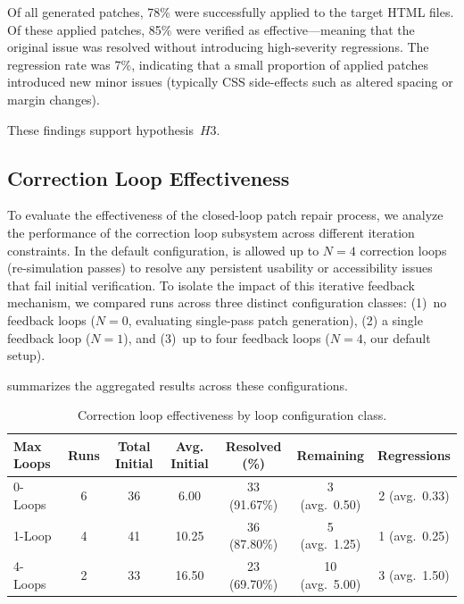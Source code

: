 Of all generated patches, 78\% were successfully applied to the target HTML files. Of these applied patches, 85\% were verified as effective---meaning that the original issue was resolved without introducing high-severity regressions. The regression rate was 7\%, indicating that a small proportion of applied patches introduced new minor issues (typically CSS side-effects such as altered spacing or margin changes).

These findings support hypothesis~$H3$.

\subsection{Correction Loop Effectiveness}
\label{sec:correction-loop}

To evaluate the effectiveness of the closed-loop patch repair process, we analyze the performance of the correction loop subsystem across different iteration constraints. In the default configuration, \versimux{} is allowed up to $N = 4$ correction loops (re-simulation passes) to resolve any persistent usability or accessibility issues that fail initial verification. To isolate the impact of this iterative feedback mechanism, we compared runs across three distinct configuration classes: (1)~no feedback loops ($N = 0$, evaluating single-pass patch generation), (2) a single feedback loop ($N = 1$), and (3)~up to four feedback loops ($N = 4$, our default setup).

 summarizes the aggregated results across these configurations.

\begin{table}[htbp]
  \centering
  \caption{Correction loop effectiveness by loop configuration class.}
  \label{tab:correction-loop-results}
  \begin{tabular}{@{}l c c c c c c@{}}
    \toprule
    \textbf{Max Loops} & \textbf{Runs} & \textbf{Total Initial} & \textbf{Avg. Initial} & \textbf{Resolved (\%)} & \textbf{Remaining} & \textbf{Regressions} \\
    \midrule
    0-Loops & 6 & 36 & 6.00  & 33 (91.67\%) & 3 (avg.\ 0.50)  & 2 (avg.\ 0.33) \\
    1-Loop  & 4 & 41 & 10.25 & 36 (87.80\%) & 5 (avg.\ 1.25)  & 1 (avg.\ 0.25) \\
    4-Loops & 2 & 33 & 16.50 & 23 (69.70\%) & 10 (avg.\ 5.00) & 3 (avg.\ 1.50) \\
    \bottomrule
  \end{tabular}
\end{table}

